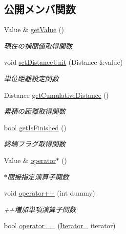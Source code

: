 \subsection*{公開メンバ関数}
\begin{DoxyCompactItemize}
\item 
Value \& \mbox{\hyperlink{class_interpolation_1_1_iterator___ab27823f286435ba0a18fe2c18ba00229}{get\+Value}} ()
\begin{DoxyCompactList}\small\item\em 現在の補間値取得関数 \end{DoxyCompactList}\item 
void \mbox{\hyperlink{class_interpolation_1_1_iterator___a6186c74f7276b8fbb521b133390fdcbf}{set\+Distance\+Unit}} (Distance \&value)
\begin{DoxyCompactList}\small\item\em 単位距離設定関数 \end{DoxyCompactList}\item 
Distance \mbox{\hyperlink{class_interpolation_1_1_iterator___a0930994b23a1ef6107ed6ce651b3e344}{get\+Cumulative\+Distance}} ()
\begin{DoxyCompactList}\small\item\em 累積の距離取得関数 \end{DoxyCompactList}\item 
bool \mbox{\hyperlink{class_interpolation_1_1_iterator___a05c51e62f7a2f97f8dc6fc3f1cff7b78}{get\+Is\+Finished}} ()
\begin{DoxyCompactList}\small\item\em 終端フラグ取得関数 \end{DoxyCompactList}\item 
Value \& \mbox{\hyperlink{class_interpolation_1_1_iterator___adb8f40c63f30301266f26d74742dcbd3}{operator$\ast$}} ()
\begin{DoxyCompactList}\small\item\em $\ast$間接指定演算子関数 \end{DoxyCompactList}\item 
void \mbox{\hyperlink{class_interpolation_1_1_iterator___a3c6e608dce87d136b0d7ed5b933b9db4}{operator++}} (int dummy)
\begin{DoxyCompactList}\small\item\em ++増加単項演算子関数 \end{DoxyCompactList}\item 
bool \mbox{\hyperlink{class_interpolation_1_1_iterator___a922fd7a71f9c457df07b7d8070d01c08}{operator==}} (\mbox{\hyperlink{class_interpolation_1_1_iterator__}{Iterator\+\_\+}} iterator)

\end{DoxyCompactItemize}
